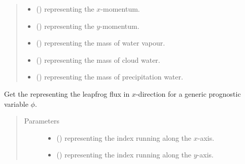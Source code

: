 \documentclass[letterpaper,10pt,english]{sphinxmanual}
\begin{document}
\begin{fulllineitems}
\begin{fulllineitems}
\begin{quote}
\begin{description}
\begin{itemize}
\item {} 
 () \textendash{}  representing the \(x\)-momentum.

\item {} 
 () \textendash{}  representing the \(y\)-momentum.

\item {} 
 () \textendash{}  representing the mass of water vapour.

\item {} 
 () \textendash{}  representing the mass of cloud water.

\item {} 
 () \textendash{}  representing the mass of precipitation water.

\end{itemize}

\end{description}\end{quote}

\end{fulllineitems}


\begin{fulllineitems}
\label{\detokenize{api:dycore.flux_isentropic.FluxIsentropicLeapfrog._get_leapfrog_flux_x}}
Get the  representing the leapfrog flux in \(x\)-direction for a generic
prognostic variable \(\phi\).
\begin{quote}\begin{description}
\item[{Parameters}] \leavevmode\begin{itemize}
\item {} 
 () \textendash{}  representing the index running along the \(x\)-axis.

\item {} 
 () \textendash{}  representing the index running along the \(y\)-axis.


\end{itemize}
\end{description}
\end{quote}
\end{fulllineitems}
\end{fulllineitems}
\end{document}
